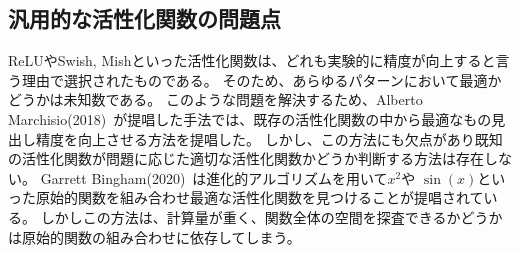 \subsection{汎用的な活性化関数の問題点}

ReLUやSwish, Mishといった活性化関数は、どれも実験的に精度が向上すると言う理由で選択されたものである。
そのため、あらゆるパターンにおいて最適かどうかは未知数である。
このような問題を解決するため、Alberto Marchisio(2018)~\cite{automatic_af}が提唱した手法では、既存の活性化関数の中から最適なもの見出し精度を向上させる方法を提唱した。
しかし、この方法にも欠点があり既知の活性化関数が問題に応じた適切な活性化関数かどうか判断する方法は存在しない。
Garrett Bingham(2020)~\cite{evo_af}は進化的アルゴリズムを用いて$ x^2 $や $ \sin (x) $といった原始的関数を組み合わせ最適な活性化関数を見つけることが提唱されている。
しかしこの方法は、計算量が重く、関数全体の空間を探査できるかどうかは原始的関数の組み合わせに依存してしまう。




